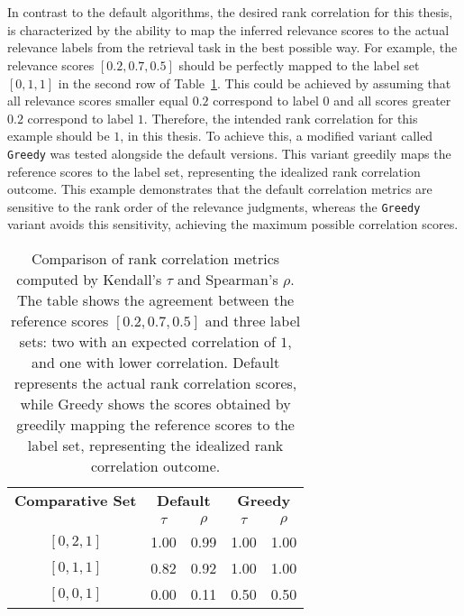 \\\\\\\\\\\\\\
In contrast to the default algorithms, the desired rank correlation for this thesis, is characterized by the ability to map the inferred relevance scores to the actual relevance labels from the retrieval task in the best possible way. For example, the relevance scores $[0.2, 0.7, 0.5]$ should be perfectly mapped to the label set $[0, 1, 1]$ in the second row of Table~\ref{tab:rank-correlation}. This could be achieved by assuming that all relevance scores smaller equal $0.2$ correspond to label $0$ and all scores greater $0.2$ correspond to label $1$. Therefore, the intended rank correlation for this example should be $1$, in this thesis. To achieve this, a modified variant called \texttt{Greedy} was tested alongside the default versions. This variant greedily maps the reference scores to the label set, representing the idealized rank correlation outcome. This example demonstrates that the default correlation metrics are sensitive to the rank order of the relevance judgments, whereas the \texttt{Greedy} variant avoids this sensitivity, achieving the maximum possible correlation scores.


\begin{table}[t]
  \centering
  \caption{Comparison of rank correlation metrics computed by Kendall's $\tau$ and Spearman's $\rho$. The table shows the agreement between the reference scores $[0.2,0.7,0.5]$ and three label sets: two with an expected correlation of $1$, and one with lower correlation. Default represents the actual rank correlation scores, while Greedy shows the scores obtained by greedily mapping the reference scores to the label set, representing the idealized rank correlation outcome.}
  \label{tab:rank-correlation}
  \begin{tabular}{ccccc}
      \toprule
      \textbf{Comparative Set} & \multicolumn{2}{c}{\textbf{Default}} & \multicolumn{2}{c}{\textbf{Greedy}} \\
      \cmidrule(lr){2-3} \cmidrule(lr){4-5}
                               & $\tau$ & $\rho$ & $\tau$ & $\rho$ \\
      \midrule
      
      $[0, 2, 1]$ & 1.00 & 0.99  & 1.00  & 1.00 \\
      $[0, 1, 1]$ & 0.82 & 0.92  & 1.00  & 1.00 \\
      $[0, 0, 1]$ & 0.00 & 0.11  & 0.50  & 0.50 \\
      \bottomrule
  \end{tabular}
\end{table}


